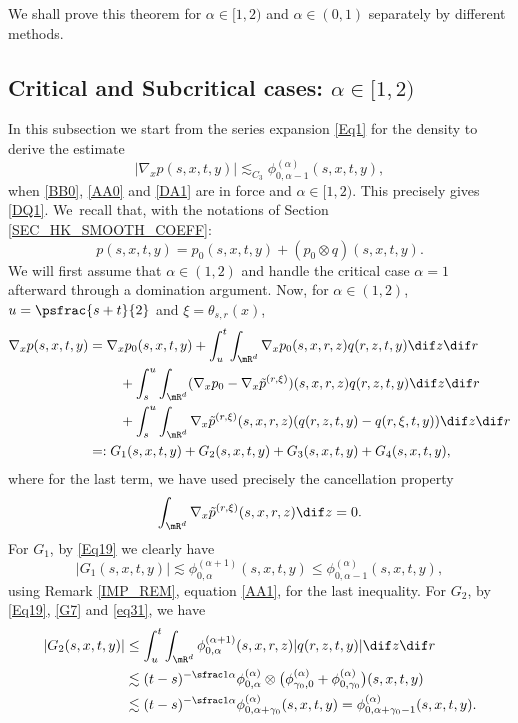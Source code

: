 We shall prove this theorem for $\alpha\in[1,2)$ and $\alpha\in(0,1)$ separately by different methods.

\subsection{Critical and Subcritical cases: $\alpha\in[1,2)$}
In this subsection we start from the series expansion \eqref{Eq1} for the density to derive the estimate
\begin{equation}\label{GR}
|\nabla_x p(s,x,t,y)|\lesssim_{C_3}\phi^{(\alpha)}_{0,\alpha-1}(s,x,t,y),
\end{equation}
when \eqref{BB0}, \eqref{AA0} and \eqref{DA1} are in force and $\alpha\in[1,2)$.
{This precisely gives \eqref{DQ1}}. We~recall that, with the notations of Section \ref{SEC_HK_SMOOTH_COEFF}:
\[
p(s,x,t,y)=p_0(s,x,t,y)+(p_0\otimes q)(s,x,t,y).
\]
{We will first assume that $\alpha\in (1,2) $ and handle the critical case $\alpha=1 $ afterward through a domination argument.
Now, for $\alpha\in (1,2) $}, $u=\psfrac{s+t}{2}$ and $\xi=\theta_{s,r}(x)$,
\begin{equation}\label{CUT_GRAD_SUB_CRITICAL}
\begin{aligned}
\nabla_x p(s,x,t,y)&=\nabla_xp_0(s,x,t,y)
+\int_{u}^{t} \int_{\mR^d}\nabla_x {p}_0(s,x,r,z)q(r,z,t,y)\dif z \dif r\\
&\hspace*{.8cm}+\int_s^u\int_{\mR^d}(\nabla_x {p}_0-\nabla_x \tilde{p}^{(r,\xi)})(s,x,r,z)q(r,z,t,y)\dif z \dif r\\
&\hspace*{.8cm} + \int_s^u\int_{\mR^d}\nabla_x\tilde{p}^{(r,\xi)}(s,x,r,z)(q(r,z,t,y)-q(r,\xi,t,y))\dif z \dif r\\
&=:G_1(s,x,t,y)+G_2(s,x,t,y)+G_3(s,x,t,y)+G_4(s,x,t,y),
\end{aligned}
\end{equation}
where for the last term, we have used precisely the cancellation property
\[
\int_{\mR^d} \nabla_x\tilde{p}^{({r},\xi)}(s,x,r,z)\dif z=0.
\]
For $G_1$, by \eqref{Eq19} we clearly have
\[
|G_1(s,x,t,y)|\lesssim \phi^{(\alpha+1)}_{0,\alpha}(s,x,t,y)\leq\phi^{(\alpha)}_{0,\alpha-1}(s,x,t,y),
\]
using Remark \ref{IMP_REM}, equation \eqref{AA1}, for the last inequality.
For $G_2$, by \eqref{Eq19}, \eqref{G7} and \eqref{eq31}, we have
\begin{align*}
|G_2(s,x,t,y)|
&\le \int_u^t\int_{\mR^d } \phi_{0,\alpha}^{(\alpha+1)}(s,x,r,z) |q(r,z,t,y)|\dif z\dif r\\
&\lesssim (t-s)^{- \sfrac 1\alpha}\phi_{0,\alpha}^{(\alpha)}\otimes\bigl(\phi_{\gamma_0,0}^{(\alpha)} +\phi_{0,\gamma_0}^{(\alpha)}\bigr)(s,x,t,y)\\
&\lesssim (t-s)^{-\sfrac1\alpha} \phi_{0,\alpha+\gamma_0}^{(\alpha)}(s,x,t,y)=\phi_{0,\alpha+\gamma_0-1}^{(\alpha)}(s,x,t,y).
\end{align*}
